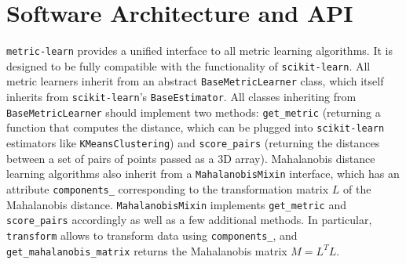 \documentclass[twoside,11pt]{article}
\newcommand{\aurelien}[1]{\todo[inline,caption={},color=orange!40]{{\it Aurelien:~}#1}}
\begin{document}
\section{Software Architecture and API}

\texttt{metric-learn} provides a unified interface to all metric learning algorithms. %
It is designed to be fully compatible with the functionality of \texttt{scikit-learn}.
All metric learners inherit from an abstract \texttt{BaseMetricLearner} class, which itself inherits from \texttt{scikit-learn}'s \texttt{BaseEstimator}. All classes inheriting from \texttt{BaseMetricLearner} should implement two methods: \texttt{get\_metric} (returning a function that computes the distance, which can be plugged into \texttt{scikit-learn} estimators like \texttt{KMeansClustering}) and \texttt{score\_pairs} (returning the distances between a set of pairs of points passed as a 3D array).
Mahalanobis distance learning algorithms also inherit from a \texttt{MahalanobisMixin} interface, which has an attribute \texttt{components\_} corresponding to the transformation matrix $L$ of the Mahalanobis distance. \texttt{MahalanobisMixin} implements \texttt{get\_metric} and \texttt{score\_pairs} accordingly as well as a few additional methods. In particular, \texttt{transform} allows to transform data using \texttt{components\_}, and \texttt{get\_mahalanobis\_matrix} returns the Mahalanobis matrix $M=L^TL$.
\end{document}
